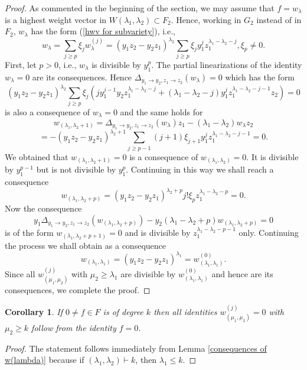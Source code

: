 \documentclass{amsart}[12pt]
\newtheorem{corollary}[theorem]{Corollary}
\theoremstyle{definition}
\begin{document}
\begin{proof}
As commented in the beginning of the section, we may assume that $f=w_{\lambda}$ is a highest weight vector in $W(\lambda_1,\lambda_2)\subset F_2$.
Hence, working in $G_2$ instead of in $F_2$, $w_{\lambda}$ has the form (\ref{hwv for subvariety}), i.e.,
\[
w_{\lambda}=\sum_{j\geq p}\xi_j w_{\lambda}^{(j)}=(y_1z_2-y_2z_1)^{\lambda_2}\sum_{j\geq p}\xi_jy_1^jz_1^{\lambda_1-\lambda_2-j},\xi_p\not=0.
\]
First, let $p>0$, i.e., $w_{\lambda}$ is divisible by $y_1^p$.
The partial linearizations of the identity $w_{\lambda}=0$ are its consequences. Hence $\Delta_{y_1\to y_2,z_1\to z_2}(w_{\lambda})=0$ which has the form
\[
(y_1z_2-y_2z_1)^{\lambda_2}\sum_{j\geq p}\xi_j(jy_1^{j-1}y_2z_1^{\lambda_1-\lambda_2-j}+(\lambda_1-\lambda_2-j)y_1^jz_1^{\lambda_1-\lambda_2-j-1}z_2)=0
\]
is also a consequence of $w_{\lambda}=0$ and the same holds for
\[
w_{(\lambda_1,\lambda_2+1)}=\Delta_{y_1\to y_2,z_1\to z_2}(w_{\lambda})z_1-(\lambda_1-\lambda_2)w_{\lambda}z_2
\]
\[
=-(y_1z_2-y_2z_1)^{\lambda_2+1}\sum_{j\geq p-1}(j+1)\xi_{j+1}y_1^jz_1^{\lambda_1-\lambda_2-j-1}=0.
\]
We obtained that $w_{(\lambda_1,\lambda_2+1)}=0$ is a consequence of $w_{(\lambda_1,\lambda_2)}=0$.
It is divisible by $y_1^{p-1}$ but is not divisible by $y_1^p$.
Continuing in this way we shall reach a consequence
\[
w_{(\lambda_1,\lambda_2+p)}=(y_1z_2-y_2z_1)^{\lambda_2+p}j!\xi_pz_1^{\lambda_1-\lambda_2-p}=0.
\]
Now the consequence
\[
y_1\Delta_{y_1\to y_2,z_1\to z_2}(w_{(\lambda_1,\lambda_2+p)})-y_2(\lambda_1-\lambda_2+p)w_{(\lambda_1,\lambda_2+p)}=0
\]
is of the form $w_{(\lambda_1,\lambda_2+p+1)}=0$ and is divisible by $z_1^{\lambda_1-\lambda_2-p-1}$ only. Continuing the process we shall obtain
as a consequence
\[
w_{(\lambda_1,\lambda_1)}=(y_1z_2-y_2z_1)^{\lambda_1}=w_{(\lambda_1,\lambda_1)}^{(0)}.
\]
Since all $w_{(\mu_1,\mu_2)}^{(j)}$ with $\mu_2\geq\lambda_1$ are divisible by $w_{(\lambda_1,\lambda_1)}^{(0)}$
and hence are its consequences, we complete the proof.
\end{proof}

\begin{corollary}\label{consequences of identity of degree k}
If $0\not=f\in F$ is of degree $k$ then all identities $w_{(\mu_1,\mu_2)}^{(j)}=0$ with $\mu_2\geq k$ follow from the identity $f=0$.
\end{corollary}

\begin{proof}
The statement follows immediately from Lemma \ref{consequences of w(lambda)} because if $(\lambda_1,\lambda_2)\vdash k$, then $\lambda_1\leq k$.
\end{proof}
\end{document}
